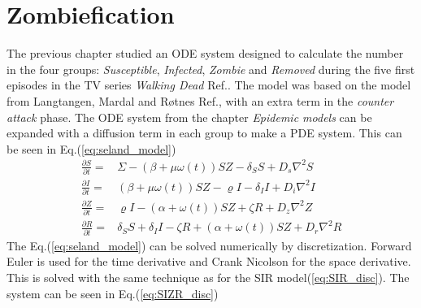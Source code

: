 \documentclass[%
twoside,                 %
final,                   %
10pt]{article}
\begin{document}
\section{Zombiefication}
The previous chapter studied an ODE system designed to calculate the number in the four groups: \emph{Susceptible}, \emph{Infected}, \emph{Zombie} and \emph{Removed} during the five first episodes in the TV series \emph{Walking Dead} Ref.\cite{walking_dead}. The model was based on the model from Langtangen, Mardal and Røtnes Ref.\cite{zombie-math}, with an extra term in the \emph{counter attack} phase. The ODE system from the chapter \emph{Epidemic models} can be expanded with a diffusion term in each group to make a PDE system. This can be seen in Eq.(\ref{eq:seland_model})  
\begin{equation} \label{eq:seland_model}
	\begin{aligned} 
	\frac{\partial S}{\partial t} =& \Sigma -(\beta+\mu \omega(t))SZ - \delta_SS +D_s\nabla^2 S \\
	\frac{\partial I}{\partial t} =& (\beta+\mu \omega(t))SZ - \varrho I - \delta_II+D_i\nabla^2 I\\
	\frac{\partial Z}{\partial t} =& \varrho I- (\alpha+\omega(t))SZ + \zeta R+D_z\nabla^2 Z\\
	\frac{\partial R}{\partial t} =& \delta_SS +\delta_II -\zeta R + (\alpha+\omega(t))SZ+D_r\nabla^2 R 
	\end{aligned}
\end{equation}
The Eq.(\ref{eq:seland_model}) can be solved numerically by discretization. Forward Euler is used for the time derivative and Crank Nicolson for the space derivative. This is solved with the same technique as for the SIR model(\ref{eq:SIR_disc}). The system can be seen in Eq.(\ref{eq:SIZR_disc})
\end{document}

